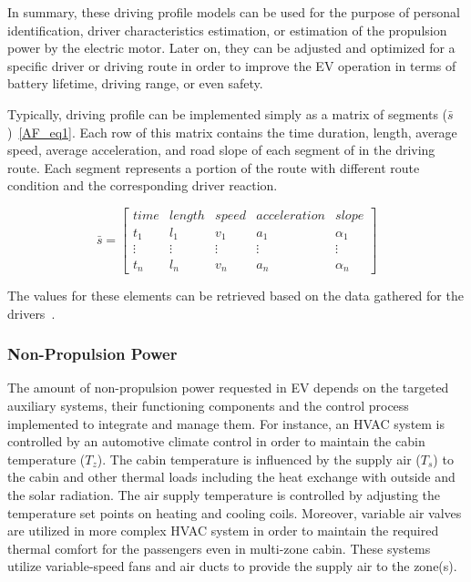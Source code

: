 In summary, these driving profile models can be used for the purpose of personal identification, driver characteristics estimation, or estimation of the propulsion power by the electric motor. Later on, they can be adjusted and optimized for a specific driver or driving route in order to improve the EV operation in terms of battery lifetime, driving range, or even safety.

Typically, driving profile can be implemented simply as a matrix of segments ($\bar{s}$)~\eqref{AF_eq1}. Each row of this matrix contains the time duration, length, average speed, average acceleration, and road slope of each segment of in the driving route. Each segment represents a portion of the route with different route condition and the corresponding driver reaction.

\begin{equation}
\bar{s} = 
\begin{bmatrix} 	
time 		& length 	& speed 	& acceleration 	& slope \\ 
t_1		&l_1		&v_1		&a_1			&\alpha_1	\\
\vdots 	&\vdots 	&\vdots 	&\vdots 		&\vdots \\
t_n		&l_n		&v_n		&a_n			&\alpha_n	
\end{bmatrix}
\label{AF_eq1}
\end{equation}

The values for these elements can be retrieved based on the data gathered for the drivers~\cite{AF_1,AF_11}.

\subsubsection{Non-Propulsion Power}

The amount of non-propulsion power requested in EV depends on the targeted auxiliary systems, their functioning components and the control process implemented to integrate and manage them.
For instance, an HVAC system is controlled by an automotive climate control in order to maintain the cabin temperature ($T_z$). The cabin temperature is influenced by the supply air ($T_s$) to the cabin and other thermal loads including the heat exchange with outside and the solar radiation. The air supply temperature is controlled by adjusting the temperature set points on heating and cooling coils. Moreover, variable air valves are utilized in more complex HVAC system in order to maintain the required thermal comfort for the passengers even in multi-zone cabin. These systems utilize variable-speed fans and air ducts to provide the supply air to the zone(s).

